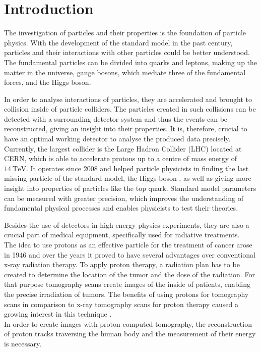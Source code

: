 \chapter{Introduction}
The investigation of particles and their properties is the foundation of particle physics. With the development of the standard model in the past century, particles
and their interactions with other particles could be better understood. The fundamental particles can be divided into quarks and leptons, making up the matter in the universe,
gauge bosons, which mediate three of the fundamental forces, and the Higgs boson.

In order to analyse interactions of particles, they are accelerated and brought to collision inside of particle colliders. The particles created in such collisions
can be detected with a surrounding detector system and thus the events can be reconstructed, giving an insight into their properties. It is, therefore, crucial to have
an optimal working detector to analyse the produced data precisely.
Currently, the largest collider is
the Large Hadron Collider (LHC) \cite{lhc} located at CERN, which is able to accelerate protons up to
a centre of mass energy of $\SI{14}{\tera\eV}$.
It operates since 2008 and helped particle physicists in finding the last missing particle of the standard model, the Higgs boson \cite{higgs}\cite{higgs_cms}, as well as giving more insight
into properties of particles like the top quark. Standard model parameters can be measured with greater precision, which improves the understanding of fundamental physical processes
and enables physicists to test their theories. %

Besides the use of detectors in high-energy physics experiments, they are also a crucial part of medical equipment, specifically used for radiative treatments. \\
The idea to use protons as an effective particle for the treatment of cancer arose in 1946 \cite{1946} and over the years it proved to have several advantages over
conventional x-ray radiation therapy. To apply proton therapy, a radiation plan has to be created to determine the location of the tumor and the dose of the radiation.
For that purpose tomography scans create images of the inside of patients, enabling the precise irradiation of tumors.
The benefits of using protons for tomography scans in comparison to x-ray tomography scans for proton therapy caused a growing interest in this technique \cite{pbt}. \\
In order to create images with proton computed tomography, the reconstruction of proton tracks traversing the human body and the measurement of their energy is necessary.


